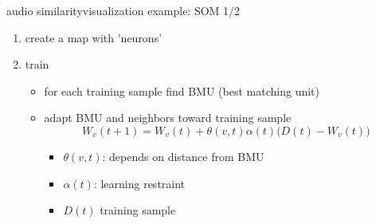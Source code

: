         \begin{frame}{audio similarity}{visualization example: SOM 1/2}
                    \begin{enumerate}
                        \item	create a map with 'neurons'
                        \item<2->	train
                                \begin{itemize}
                                    \item	for each training sample find BMU (best matching unit)
                                    \item	adapt BMU and neighbors toward training sample
                                    \begin{equation*}
                                        W_v(t + 1) = W_v(t) + \theta (v, t) \alpha(t)\big(D(t) - W_v(t)\big)
                                    \end{equation*}
                                    \begin{footnotesize}
                                        \begin{itemize}
                                            \item	$\theta (v, t)$: depends on distance from BMU
                                            \item	$\alpha (t)$: learning restraint
                                            \item	$D(t)$ training sample
                                        \end{itemize}
                                    \end{footnotesize}
                                \end{itemize}
                    \end{enumerate}
        \end{frame}
